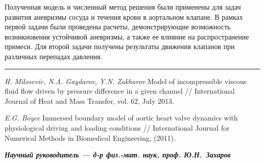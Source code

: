 \documentclass{article}
\begin{document}
Полученная модель и численный метод решения были применены для задач развития аневризмы сосуда и течения крови в аортальном клапане. В рамках первой задачи были проведены расчеты, демонстрирующие возможность возникновения устойчивой аневризмы, а также ее влияние на распространение примеси. Для второй задачи получены результаты движения клапанов при различных перепадах давления.

\noindent\rule{50.0mm}{0.1mm}

\begin{enumerate}
\textit{H. Milosevic, N.A. Gaydarov, Y.N. Zakharov} Model of incompressible viscous fluid flow driven by  pressure difference in a given channel // International Journal of Heat and Mass Transfer, vol. 62, July 2013.

\textit{E.G. Boyce} Immersed boundary model of aortic heart valve dynamics with physiological driving and loading conditions // International Journal for Numerical Methods in Biomedical Engineering, (2011).
\end{enumerate}


\begin{flushright}
\textbf{\textit{Научный руководитель --- д-р физ.-мат. наук, проф.
Ю.Н.~Захаров}}

\end{flushright}
\end{document}
